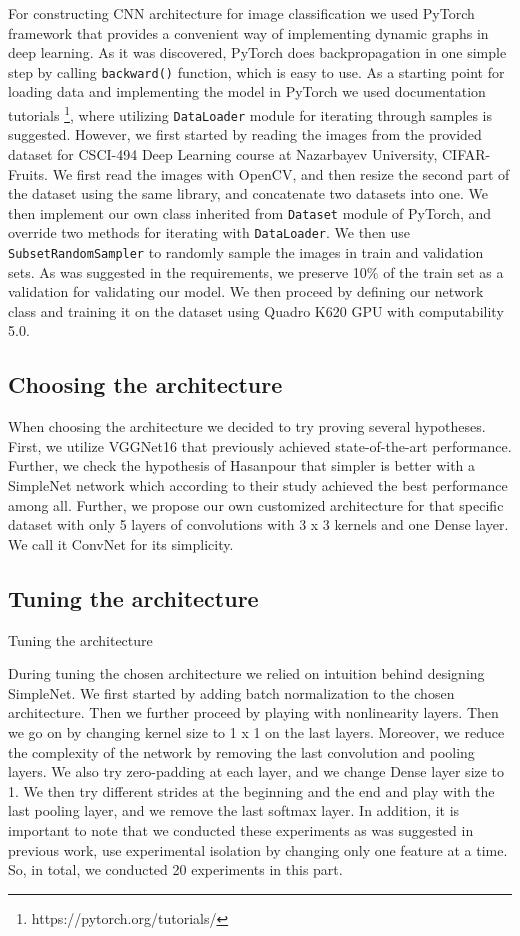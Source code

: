 \documentclass{IEEEtran}
\begin{document}
For constructing CNN architecture for image classification we used PyTorch framework that provides a convenient way of implementing dynamic graphs in deep learning. As it was discovered, PyTorch does backpropagation in one simple step by calling \texttt{backward()} function, which is easy to use. As a starting point for loading data and implementing the model in PyTorch we used documentation tutorials \footnote{https://pytorch.org/tutorials/}, where utilizing \texttt{DataLoader} module for iterating through samples is suggested. However, we first started by reading the images from the provided dataset for CSCI-494 Deep Learning course at Nazarbayev University, CIFAR-Fruits. We first read the images with OpenCV, and then resize the second part of the dataset using the same library, and concatenate two datasets into one. We then implement our own class inherited from \texttt{Dataset} module of PyTorch, and override two methods for iterating with \texttt{DataLoader}. We then use \texttt{SubsetRandomSampler} to randomly sample the images in train and validation sets. As was suggested in the requirements, we preserve 10\% of the train set as a validation for validating our model. We then proceed by defining our network class and training it on the dataset using Quadro K620 GPU with computability 5.0.

\subsection{Choosing the architecture}

When choosing the architecture we decided to try proving several hypotheses. First, we utilize VGGNet16 that previously achieved state-of-the-art performance. Further, we check the hypothesis of Hasanpour \cite{DBLP:journals/corr/HasanPourRVS16} that simpler is better with a SimpleNet network which according to their study achieved the best performance among all. Further, we propose our own customized architecture for that specific dataset with only 5 layers of convolutions with 3 x 3 kernels and one Dense layer. We call it ConvNet for its simplicity.

\subsection{Tuning the architecture}

Tuning the architecture

During tuning the chosen architecture we relied on intuition behind designing SimpleNet. We first started by adding batch normalization to the chosen architecture. Then we further proceed by playing with nonlinearity layers. Then we go on by changing kernel size to 1 x 1 on the last layers. Moreover, we reduce the complexity of the network by removing the last convolution and pooling layers. We also try zero-padding at each layer, and we change Dense layer size to 1. We then try different strides at the beginning and the end and play with the last pooling layer, and we remove the last softmax layer. In addition, it is important to note that we conducted these experiments as was suggested in previous work, use experimental isolation by changing only one feature at a time. So, in total, we conducted 20 experiments in this part.
\end{document}
